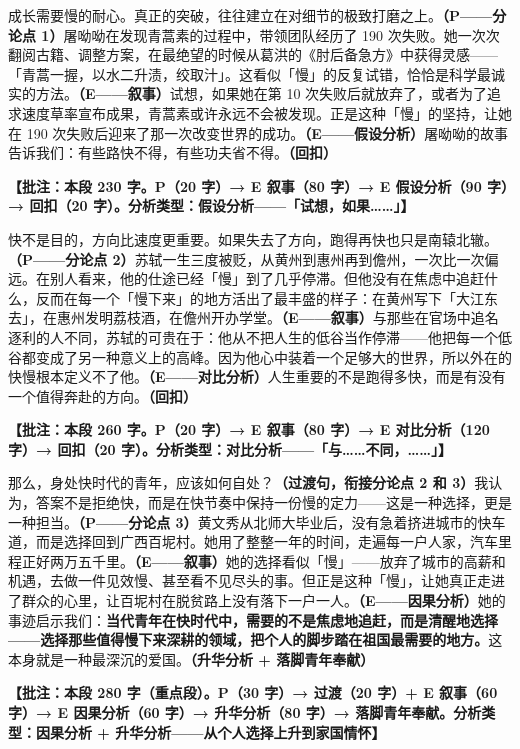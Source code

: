 成长需要慢的耐心。真正的突破，往往建立在对细节的极致打磨之上。\textbf{（P——分论点 1）}屠呦呦在发现青蒿素的过程中，带领团队经历了 190 次失败。她一次次翻阅古籍、调整方案，在最绝望的时候从葛洪的《肘后备急方》中获得灵感——「青蒿一握，以水二升渍，绞取汁」。这看似「慢」的反复试错，恰恰是科学最诚实的方法。\textbf{（E——叙事）}试想，如果她在第 10 次失败后就放弃了，或者为了追求速度草率宣布成果，青蒿素或许永远不会被发现。正是这种「慢」的坚持，让她在 190 次失败后迎来了那一次改变世界的成功。\textbf{（E——假设分析）}屠呦呦的故事告诉我们：有些路快不得，有些功夫省不得。\textbf{（回扣）}

\textbf{【批注：本段 230 字。P（20 字）→ E 叙事（80 字）→ E 假设分析（90 字）→ 回扣（20 字）。分析类型：假设分析——「试想，如果……」】}

快不是目的，方向比速度更重要。如果失去了方向，跑得再快也只是南辕北辙。\textbf{（P——分论点 2）}苏轼一生三度被贬，从黄州到惠州再到儋州，一次比一次偏远。在别人看来，他的仕途已经「慢」到了几乎停滞。但他没有在焦虑中追赶什么，反而在每一个「慢下来」的地方活出了最丰盛的样子：在黄州写下「大江东去」，在惠州发明荔枝酒，在儋州开办学堂。\textbf{（E——叙事）}与那些在官场中追名逐利的人不同，苏轼的可贵在于：他从不把人生的低谷当作停滞——他把每一个低谷都变成了另一种意义上的高峰。因为他心中装着一个足够大的世界，所以外在的快慢根本定义不了他。\textbf{（E——对比分析）}人生重要的不是跑得多快，而是有没有一个值得奔赴的方向。\textbf{（回扣）}

\textbf{【批注：本段 260 字。P（20 字）→ E 叙事（80 字）→ E 对比分析（120 字）→ 回扣（20 字）。分析类型：对比分析——「与……不同，……」】}

那么，身处快时代的青年，应该如何自处？\textbf{（过渡句，衔接分论点 2 和 3）}我认为，答案不是拒绝快，而是在快节奏中保持一份慢的定力——这是一种选择，更是一种担当。\textbf{（P——分论点 3）}黄文秀从北师大毕业后，没有急着挤进城市的快车道，而是选择回到广西百坭村。她用了整整一年的时间，走遍每一户人家，汽车里程正好两万五千里。\textbf{（E——叙事）}她的选择看似「慢」——放弃了城市的高薪和机遇，去做一件见效慢、甚至看不见尽头的事。但正是这种「慢」，让她真正走进了群众的心里，让百坭村在脱贫路上没有落下一户一人。\textbf{（E——因果分析）}她的事迹启示我们：\textbf{当代青年在快时代中，需要的不是焦虑地追赶，而是清醒地选择——选择那些值得慢下来深耕的领域，把个人的脚步踏在祖国最需要的地方。}这本身就是一种最深沉的爱国。\textbf{（升华分析 + 落脚青年奉献）}

\textbf{【批注：本段 280 字（重点段）。P（30 字）→ 过渡（20 字）+ E 叙事（60 字）→ E 因果分析（60 字）→ 升华分析（80 字）→ 落脚青年奉献。分析类型：因果分析 + 升华分析——从个人选择上升到家国情怀】}

